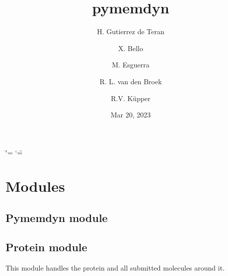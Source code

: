 \documentclass[letterpaper,10pt,english]{sphinxmanual}
\title{pymemdyn}
\date{Mar 20, 2023}
\author{H. Gutierrez de Teran \and X. Bello \and M. Esguerra \and R. L. van den Broek \and R.V. Küpper}
\begin{document}
\ifdefined\shorthandoff
  \ifnum\catcode`\=\string=\active\shorthandoff{=}\fi
  \ifnum\catcode`\"=\active{}\fi
\fi

\pagestyle{empty}
\sphinxmaketitle
\pagestyle{plain}
\sphinxtableofcontents
\pagestyle{normal}
\label{\detokenize{index::doc}}


\sphinxstepscope


\chapter{Modules}
\label{\detokenize{modules:modules}}\label{\detokenize{modules::doc}}
\sphinxstepscope


\section{Pymemdyn module}
\label{\detokenize{pymemdyn:pymemdyn-module}}\label{\detokenize{pymemdyn::doc}}
\sphinxstepscope


\section{Protein module}
\label{\detokenize{protein:module-protein}}\label{\detokenize{protein:protein-module}}\label{\detokenize{protein::doc}}
\sphinxAtStartPar
This module handles the protein and all submitted molecules around it.
\end{document}
